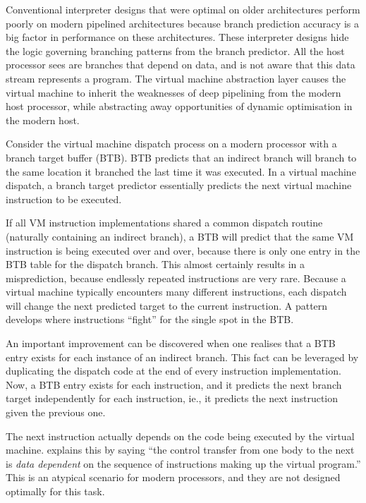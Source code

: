 		Conventional interpreter designs that were optimal on older architectures perform poorly on modern pipelined architectures because branch prediction accuracy is a big factor in performance on these architectures. These interpreter designs hide the logic governing branching patterns from the branch predictor. All the host processor sees are branches that depend on data, and is not aware that this data stream represents a program. The virtual machine abstraction layer causes the virtual machine to inherit the weaknesses of deep pipelining from the modern host processor, while abstracting away opportunities of dynamic optimisation in the modern host.
		
		Consider the virtual machine dispatch process on a modern processor with a branch target buffer (BTB). BTB predicts that an indirect branch will branch to the same location it branched the last time it was executed. In a virtual machine dispatch, a branch target predictor essentially predicts the next virtual machine instruction to be executed.
		
		If all VM instruction implementations shared a common dispatch routine (naturally containing an indirect branch), a BTB will predict that the same VM instruction is being executed over and over, because there is only one entry in the BTB table for the dispatch branch. This almost certainly results in a misprediction, because endlessly repeated instructions are very rare. Because a virtual machine typically encounters many different instructions, each dispatch will change the next predicted target to the current instruction. A pattern develops where instructions ``fight'' for the single spot in the BTB.
		
		An important improvement can be discovered when one realises that a BTB entry exists for each instance of an indirect branch. This fact can be leveraged by duplicating the dispatch code at the end of every instruction implementation. Now, a BTB entry exists for each instruction, and it predicts the next branch target independently for each instruction, ie., it predicts the next instruction given the previous one.
		
		The next instruction actually depends on the code being executed by the virtual machine. \cite{yeti} explains this by saying ``the control transfer from one body to the next is \emph{data dependent} on the sequence of instructions making up the virtual program.'' This is an atypical scenario for modern processors, and they are not designed optimally for this task.
		
